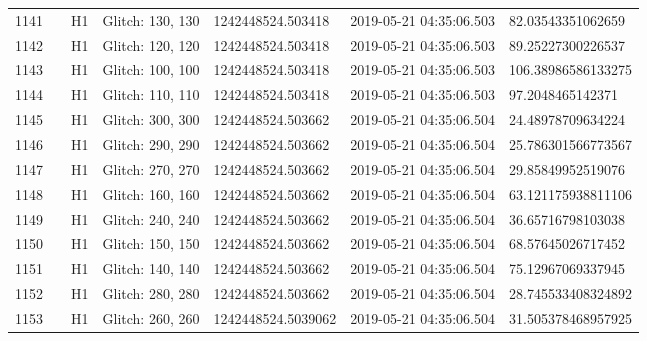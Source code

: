 \begin{longtable}{lllllll}
1141 &                                                    &       H1 &  Glitch: 130, 130 &   1242448524.503418 &  2019-05-21 04:35:06.503 &   82.03543351062659 \\
1142 &                                                    &       H1 &  Glitch: 120, 120 &   1242448524.503418 &  2019-05-21 04:35:06.503 &   89.25227300226537 \\
1143 &                                                    &       H1 &  Glitch: 100, 100 &   1242448524.503418 &  2019-05-21 04:35:06.503 &  106.38986586133275 \\
1144 &                                                    &       H1 &  Glitch: 110, 110 &   1242448524.503418 &  2019-05-21 04:35:06.503 &    97.2048465142371 \\
1145 &                                                    &       H1 &  Glitch: 300, 300 &   1242448524.503662 &  2019-05-21 04:35:06.504 &   24.48978709634224 \\
1146 &                                                    &       H1 &  Glitch: 290, 290 &   1242448524.503662 &  2019-05-21 04:35:06.504 &  25.786301566773567 \\
1147 &                                                    &       H1 &  Glitch: 270, 270 &   1242448524.503662 &  2019-05-21 04:35:06.504 &   29.85849952519076 \\
1148 &                                                    &       H1 &  Glitch: 160, 160 &   1242448524.503662 &  2019-05-21 04:35:06.504 &  63.121175938811106 \\
1149 &                                                    &       H1 &  Glitch: 240, 240 &   1242448524.503662 &  2019-05-21 04:35:06.504 &   36.65716798103038 \\
1150 &                                                    &       H1 &  Glitch: 150, 150 &   1242448524.503662 &  2019-05-21 04:35:06.504 &   68.57645026717452 \\
1151 &                                                    &       H1 &  Glitch: 140, 140 &   1242448524.503662 &  2019-05-21 04:35:06.504 &   75.12967069337945 \\
1152 &                                                    &       H1 &  Glitch: 280, 280 &   1242448524.503662 &  2019-05-21 04:35:06.504 &  28.745533408324892 \\
1153 &                                                    &       H1 &  Glitch: 260, 260 &  1242448524.5039062 &  2019-05-21 04:35:06.504 &  31.505378468957925 \\

\end{longtable}
